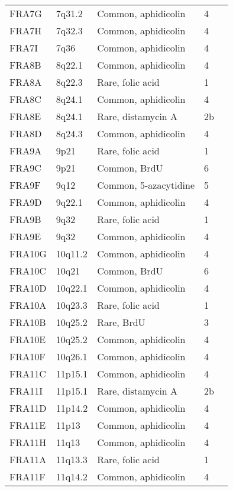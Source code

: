 \documentclass[phd,tocprelim]{cornell}
\begin{document}
\begin{table}
\begin{tabular}{l*{4}{l}}
     FRA7G  & 7q31.2   & Common, aphidicolin   & 4 \\
     FRA7H  & 7q32.3   & Common, aphidicolin   & 4 \\
     FRA7I  & 7q36     & Common, aphidicolin   & 4 \\
     FRA8B  & 8q22.1   & Common, aphidicolin   & 4 \\
     FRA8A  & 8q22.3   & Rare, folic acid    & 1 \\
     FRA8C  & 8q24.1   & Common, aphidicolin   & 4 \\
     FRA8E  & 8q24.1   & Rare, distamycin A  & 2b \\
     FRA8D  & 8q24.3   & Common, aphidicolin   & 4 \\
     FRA9A  & 9p21     & Rare, folic acid    & 1 \\
     FRA9C  & 9p21     & Common, BrdU          & 6 \\
     FRA9F  & 9q12     & Common, 5-azacytidine & 5 \\
     FRA9D  & 9q22.1   & Common, aphidicolin   & 4 \\
     FRA9B  & 9q32     & Rare, folic acid    & 1 \\
     FRA9E  & 9q32     & Common, aphidicolin   & 4 \\
     FRA10G & 10q11.2  & Common, aphidicolin   & 4 \\
     FRA10C & 10q21    & Common, BrdU          & 6 \\
     FRA10D & 10q22.1  & Common, aphidicolin   & 4 \\
     FRA10A & 10q23.3  & Rare, folic acid    & 1 \\
     FRA10B & 10q25.2  & Rare, BrdU          & 3 \\
     FRA10E & 10q25.2  & Common, aphidicolin   & 4 \\
     FRA10F & 10q26.1  & Common, aphidicolin   & 4 \\
     FRA11C & 11p15.1  & Common, aphidicolin   & 4 \\
     FRA11I & 11p15.1  & Rare, distamycin A  & 2b \\
     FRA11D & 11p14.2  & Common, aphidicolin   & 4 \\
     FRA11E & 11p13    & Common, aphidicolin   & 4 \\
     FRA11H & 11q13    & Common, aphidicolin   & 4 \\
     FRA11A & 11q13.3  & Rare, folic acid    & 1 \\
     FRA11F & 11q14.2  & Common, aphidicolin   & 4 \\

\end{tabular}
\end{table}
\end{document}
